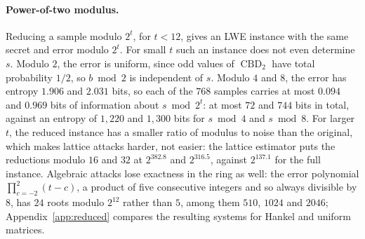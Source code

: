 \documentclass[11pt,a4paper]{article}
\theoremstyle{definition}
\newcommand{\CBD}{\operatorname{CBD}}
\begin{document}
\paragraph{Power-of-two modulus.} Reducing a sample modulo $2^t$, for $t < 12$, gives an LWE instance with the same secret and error modulo $2^t$. For small $t$ such an instance does not even determine $s$. Modulo $2$, the error is uniform, since odd values of $\CBD_2$ have total probability $1/2$, so $b \bmod 2$ is independent of $s$. Modulo $4$ and $8$, the error has entropy $1.906$ and $2.031$ bits, so each of the $768$ samples carries at most $0.094$ and $0.969$ bits of information about $s \bmod 2^t$: at most $72$ and $744$ bits in total, against an entropy of $1{,}220$ and $1{,}300$ bits for $s \bmod 4$ and $s \bmod 8$. For larger $t$, the reduced instance has a smaller ratio of modulus to noise than the original, which makes lattice attacks harder, not easier: the lattice estimator puts the reductions modulo $16$ and $32$ at $2^{382.8}$ and $2^{316.5}$, against $2^{137.1}$ for the full instance. Algebraic attacks lose exactness in the ring as well: the error polynomial $\prod_{c=-2}^{2}(t - c)$, a product of five consecutive integers and so always divisible by $8$, has $24$ roots modulo $2^{12}$ rather than $5$, among them $510$, $1024$ and $2046$; Appendix~\ref{app:reduced} compares the resulting systems for Hankel and uniform matrices.
\end{document}
